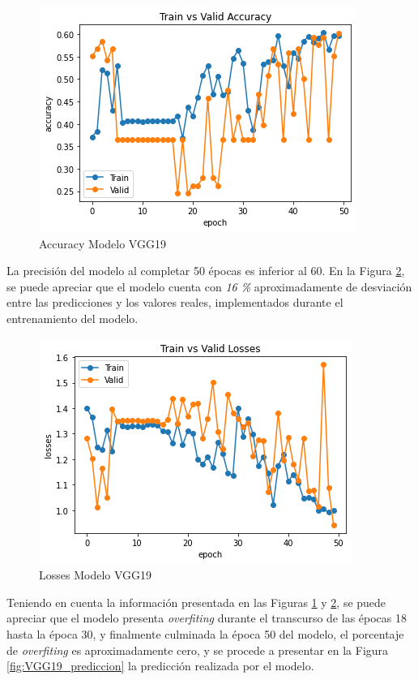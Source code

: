 								
				\begin{figure}[ht]
					\centering
					\includegraphics[scale=0.5]{Figs/101.png}
					\caption{Accuracy Modelo VGG19}
					\label{fig:VGG19_accuracy}
				\end{figure}  

				La precisión del modelo al completar 50 épocas es inferior al 60.	En la Figura \ref{fig:VGG19_losses}, se puede apreciar que el modelo cuenta con \textit{16 \%} aproximadamente de desviación entre las predicciones y los valores reales, implementados durante el entrenamiento del modelo.
				
				\begin{figure}[ht]
					\centering
					\includegraphics[scale=0.55]{Figs/102.png}
					\caption{Losses Modelo VGG19}
					\label{fig:VGG19_losses}
				\end{figure}
			
			Teniendo en cuenta la información presentada en las Figuras \ref{fig:VGG19_accuracy} y \ref{fig:VGG19_losses}, se puede apreciar que el modelo presenta \textit{overfiting} durante el transcurso de las épocas 18 hasta la época 30, y finalmente culminada la época 50 del modelo, el porcentaje de \textit{overfiting} es aproximadamente cero, y se procede a presentar en la Figura \ref*{fig:VGG19_prediccion} la predicción realizada por el modelo.
			
